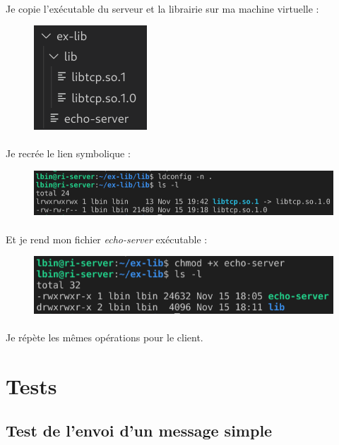 \documentclass{article}
\begin{document}
    \paragraph{}
    Je copie l'exécutable du serveur et la librairie sur ma machine virtuelle :
    \begin{figure}[H]
        \centering
        \includegraphics[width=.15\linewidth]{./screenshots/server-files.png}
    \end{figure}

    \paragraph{}
    Je recrée le lien symbolique :
    \begin{figure}[H]
        \centering
        \includegraphics[width=.65\linewidth]{./screenshots/server-link.png}
    \end{figure}

    \paragraph{}
    Et je rend mon fichier \emph{echo-server} exécutable :
    \begin{figure}[H]
        \centering
        \includegraphics[width=.55\linewidth]{./screenshots/server-exec.png}
    \end{figure}

    \paragraph{}
    Je répète les mêmes opérations pour le client.

    \section{Tests}
    \subsection{Test de l'envoi d'un message simple}
\end{document}
